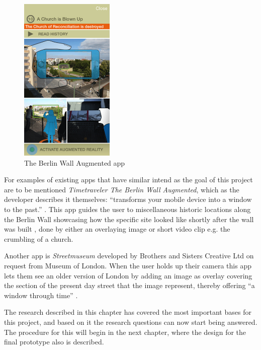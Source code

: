 \begin{figure}
\centering
        \includegraphics[width=0.4\textwidth]{figures/berlinwall.jpeg}
        \caption{The Berlin Wall Augmented app \cite{Hardenberg}}\label{fig:berlin}
\end{figure}

For examples of existing apps that have similar intend as the goal of this project are to be mentioned \textit{Timetraveler The Berlin Wall Augmented}, which as the developer describes it themselves: “transforms your mobile device into a window to the past.” \cite{Hardenberg}. This app guides the user to miscellaneous historic locations along the Berlin Wall showcasing how the specific site looked like shortly after the wall was built \cite{Hardenberg}, done by either an overlaying image or short video clip e.g. the crumbling of a church.

Another app is \textit{Streetmuseum} developed by Brothers and Sisters Creative Ltd on request from Museum of London. When the user holds up their camera this app lets them see an older version of London by adding an image as overlay covering the section of the present day street that the image represent, thereby offering “a window through time” \cite{Brothers}.

The research described in this chapter has covered the most important bases for this project, and based on it the research questions can now start being answered. The procedure for this will begin in the next chapter, where the design for the final prototype also is described. 


